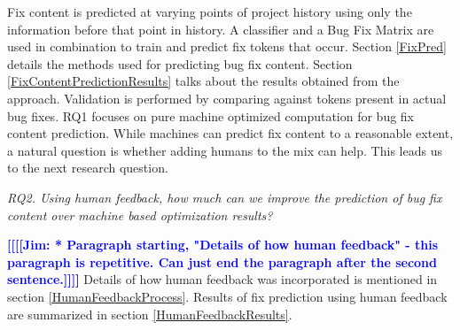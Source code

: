 \documentclass[10pt, conference, letterpaper, compsocconf]{IEEEtran}
\newcommand{\todoc}[2]{{\textcolor{#1} {\textbf{[[#2]]}}}}
\newcommand{\todored}[1]{\todoc{red}  {\textbf{[[#1]]}}}
\newcommand{\todoblue}[1]{\todoc{blue}{\textbf{[[#1]]}}}
\newcommand{\sung}[1]{\todored{Sung: #1}}
\newcommand{\jim}[1]{\todoblue{Jim: #1}}
\begin{document}
Fix content is predicted at varying points of project history using
only the information before that point in history. A classifier
and a Bug Fix Matrix are used in combination to train and predict fix tokens that occur. Section
\ref{FixPred} details the methods used for predicting
bug fix content. Section \ref{FixContentPredictionResults} talks
about the results obtained from the approach. Validation is performed by comparing against tokens present in actual bug fixes. RQ1 focuses on
pure machine optimized computation for bug fix content prediction. 
While machines can predict fix content to a reasonable extent, a natural
question is whether adding humans to the mix can help. This leads
us to the next research question.

\textit{RQ2. Using human feedback, how much can we improve
the prediction of bug fix content over machine based optimization
results?}

\jim{* Paragraph starting, "Details of how human feedback" - this paragraph is repetitive. Can just end the paragraph after the second sentence.}
Details of how human feedback was incorporated is mentioned in section
\ref{HumanFeedbackProcess}. Results of fix prediction using human
feedback are summarized in section \ref{HumanFeedbackResults}.
% 
% 
% 
% 
% 
\end{document}
